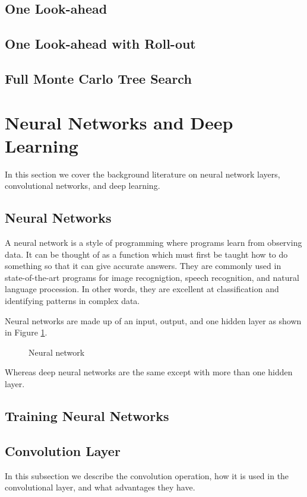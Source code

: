 \documentclass{bhamthesis}
\theoremstyle{definition}
\begin{document}
\subsection{One Look-ahead}
\subsection{One Look-ahead with Roll-out}
\subsection{Full Monte Carlo Tree Search}
\section{Neural Networks and Deep Learning}
In this section we cover the background literature on neural network layers, convolutional networks, and deep learning.

\subsection{Neural Networks}
A neural network is a style of programming where programs learn from observing data. It can be thought of as a function which must first be taught how to do something so that it can give accurate answers. They are commonly used in state-of-the-art programs for image recognigtion, speech recognition, and natural language procession. In other words, they are excellent at classification and identifying patterns in complex data.

Neural networks are made up of an input, output, and one hidden layer as shown in Figure \ref{f:NN}.
\begin{figure}
	
	\caption{Neural network}\label{f:NN}
\end{figure}
Whereas deep neural networks are the same except with more than one hidden layer.

\subsection{Training Neural Networks}\label{s:nnTrainLit}

\subsection{Convolution Layer}
In this subsection we describe the convolution operation, how it is used in the convolutional layer, and what advantages they have.
\end{document}
